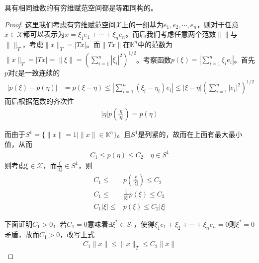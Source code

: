 \begin{theorem}
    具有相同维数的有穷维赋范空间都是等距同构的。
\end{theorem}
\begin{proof}
    这里我们考虑有穷维赋范空间$\mathscr{X}$上的一组基为$e_1,e_2,\cdots,e_n$，则对于任意$x\in\mathscr{X}$都可以表示为$x = \xi_1e_1 + \cdots + \xi_ne_n$。而后我们考虑任意两个范数$\| \|$与$\| \|_T$，考虑$\|x\|_T = |Tx|$。而$\|Tx\|$在$\mathbb{K}^n$中的范数为$\|x\|_T = |Tx| = \|\xi\| = \left(\sum\limits_{i=1}^n |\xi_i|^2 \right)^{1/2}$。考察函数$p(\xi) = \left|\sum\limits_{i=1}^n \xi_i e_i\right|$。首先$p$对$\xi$是一致连续的
    \begin{align*}
        |p(\xi) - p(\eta)| &= p(\xi - \eta) \leqslant \left|\sum\limits_{i=1}^n (\xi_i - \eta_i) e_i \right| \leqslant |\xi - \eta| \left(\sum\limits_{i=1}^n |e_i|^2 \right)^{1/2}
    \end{align*}
    而后根据范数的齐次性
    \begin{align*}
        |\eta|p(\frac{\eta}{|\eta|}) = p(\eta)
    \end{align*}

    而由于$S^1 = \{\|x\| = 1\mid \|x\|\in\mathbb{K}^n\}$。且$S^1$是列紧的，故而在上面有最大最小值，从而
    \begin{align*}
        C_1 \leqslant p(\eta) \leqslant C_2 \quad \eta \in S^1
    \end{align*}
    则考虑$\xi\in \mathscr{X}$，而$\frac{\xi}{|\xi|}\in S^1$，则
    \begin{align*}
        C_1 \leqslant & p(\frac{\xi}{|\xi|}) \leqslant C_2 \\
        C_1 \leqslant & \frac{1}{|\xi|}p(\xi) \leqslant C_2 \\
        C_1 |\xi| \leqslant & p(\xi) \leqslant C_2 |\xi|
    \end{align*}

    下面证明$C_1>0$，若$C_1 = 0$意味着$\exists \xi^*\in S_1$，使得$\xi_1 e_1 + \xi_2 + \cdots + \xi_n e_n = 0$则$\xi^* = 0$矛盾，故而$C_1>0$，改写上式
    \begin{align*}
        C_1 \|x\|\leqslant \|x\|_T \leqslant C_2\|x\|
    \end{align*}
\end{proof}

